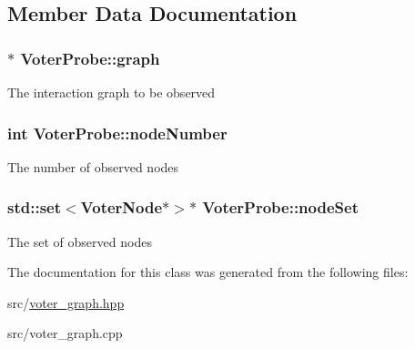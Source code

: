 \subsection{Member Data Documentation}
\hypertarget{classVoterProbe_add099ac2ac20a5f6a0e3616e78639497}{
\subsubsection[{graph}]{$\ast$ Voter\-Probe\-::graph}}\label{classVoterProbe_add099ac2ac20a5f6a0e3616e78639497}
The interaction graph to be observed \hypertarget{classVoterProbe_af0a20a6fc8a68f3ace3384cbbd6aa39f}{
\subsubsection[{node\-Number}]{\setlength{\rightskip}{0pt plus 5cm}int Voter\-Probe\-::node\-Number}}\label{classVoterProbe_af0a20a6fc8a68f3ace3384cbbd6aa39f}
The number of observed nodes \hypertarget{classVoterProbe_ae51e09098a03f3e064c8a1a8182a2eeb}{
\subsubsection[{node\-Set}]{\setlength{\rightskip}{0pt plus 5cm}std\-::set$<${\bf Voter\-Node}$\ast$$>$$\ast$ Voter\-Probe\-::node\-Set}}\label{classVoterProbe_ae51e09098a03f3e064c8a1a8182a2eeb}
The set of observed nodes 

The documentation for this class was generated from the following files\-:\begin{DoxyCompactItemize}
\item 
src/\hyperlink{voter__graph_8hpp}{voter\-\_\-graph.\-hpp}\item 
src/voter\-\_\-graph.\-cpp\end{DoxyCompactItemize}
